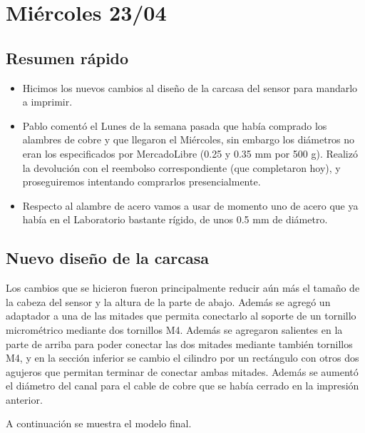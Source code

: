 \section{Miércoles 23/04}
\subsection*{Resumen rápido}
\begin{itemize}
	\item Hicimos los nuevos cambios al diseño de la carcasa del sensor para mandarlo a imprimir.
	\item Pablo comentó el Lunes de la semana pasada que había comprado los alambres de cobre y que llegaron el Miércoles, sin embargo los diámetros no eran los especificados por MercadoLibre (0.25 y 0.35 mm por 500 g). Realizó la devolución con el reembolso correspondiente (que completaron hoy), y proseguiremos intentando comprarlos presencialmente.
	\item Respecto al alambre de acero vamos a usar de momento uno de acero que ya había en el Laboratorio bastante rígido, de unos 0.5 mm de diámetro.
\end{itemize}

\subsection*{Nuevo diseño de la carcasa}
Los cambios que se hicieron fueron principalmente reducir aún más el tamaño de la cabeza del sensor y la altura de la parte de abajo. Además se agregó un adaptador a una de las mitades que permita conectarlo al soporte de un tornillo micrométrico mediante dos tornillos M4. Además se agregaron salientes en la parte de arriba para poder conectar las dos mitades mediante también tornillos M4, y en la sección inferior se cambio el cilindro por un rectángulo con otros dos agujeros que permitan terminar de conectar ambas mitades. Además se aumentó el diámetro del canal para el cable de cobre que se había cerrado en la impresión anterior.

A continuación se muestra el modelo final.


